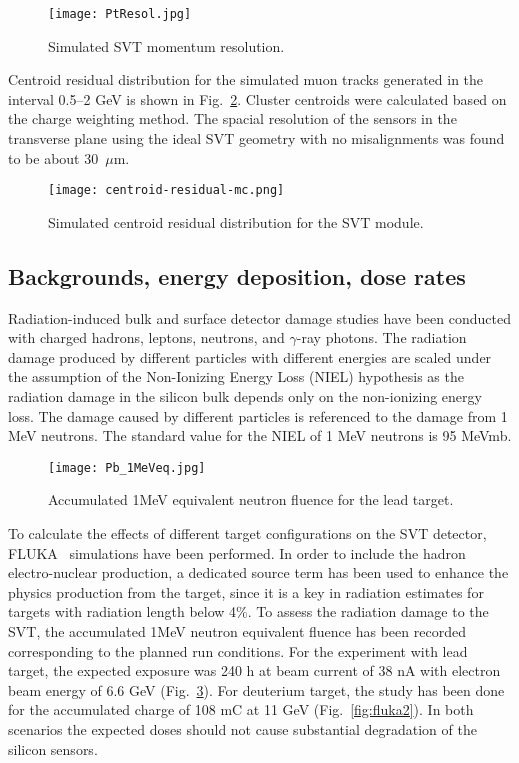 \begin{figure}[hbt]
\texttt{[image: PtResol.jpg]}
\caption{Simulated SVT momentum resolution.}
\label{fig:PtRes}
\end{figure}

Centroid residual distribution for the simulated muon tracks generated in the interval 0.5--2 GeV is shown in Fig.~\ref{fig:centroid-residual-mc}. Cluster centroids were calculated based on the charge weighting method. The spacial resolution of the sensors in the transverse plane using the ideal SVT geometry with no misalignments was found to be about 30~$\mu$m. 

\begin{figure}[hbt]
\texttt{[image: centroid-residual-mc.png]}
\caption{Simulated centroid residual distribution for the SVT module.}
\label{fig:centroid-residual-mc}
\end{figure}

\subsection{Backgrounds, energy deposition, dose rates}

Radiation-induced bulk and surface detector damage studies have been conducted with charged hadrons, leptons, neutrons, and $\gamma$-ray photons. The radiation damage produced by different particles with different energies are scaled under the assumption of the Non-Ionizing Energy Loss (NIEL) hypothesis as the radiation damage in the silicon bulk depends only on the non-ionizing energy loss. The damage caused by different particles is referenced to the damage from 1 MeV neutrons. The standard value for the NIEL of 1 MeV neutrons is 95 MeVmb. 

\begin{figure}[hbt] 
\centering 
\texttt{[image: Pb\_1MeVeq.jpg]}
\caption{Accumulated 1MeV equivalent neutron fluence for the lead target.}
\label{fig:fluka1}
\end{figure}

To calculate the effects of different target configurations on the SVT detector,  FLUKA~\cite{FLUKA1, FLUKA2} simulations have been performed. In order to include the hadron electro-nuclear production, a dedicated source term has been used to enhance the physics production from the target, since it is a key in radiation estimates for targets with radiation length below 4$\%$. To assess the radiation damage to the SVT, the accumulated 1MeV neutron equivalent fluence has been recorded corresponding to the planned run conditions. For the experiment with lead target, the expected exposure was 240 h at beam current of 38 nA with electron beam energy of 6.6 GeV (Fig.~\ref{fig:fluka1}). For deuterium target, the study has been done for the accumulated charge of 108 mC at 11 GeV (Fig.~\ref{fig:fluka2}). In both scenarios the expected doses should not cause substantial degradation of the silicon sensors.

